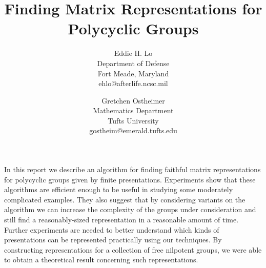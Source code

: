



\newtheorem{theorem}{Theorem}[section]
\newtheorem{proposition}[theorem]{Proposition}
\newtheorem{lemma}[theorem]{Lemma}
\newtheorem{corollary}[theorem]{Corollary}
\newenvironment{hypothesis}{\em Hypothesis $(\dagger):$}{}
\newcommand{\glz}[1]{\mbox{GL} (#1,{\bf Z})}
\newcommand{\trz}[1]{\mbox{Tr}_1(#1,{\bf Z})}

\title{Finding Matrix Representations for Polycyclic Groups}
\author{Eddie H. Lo \\ Department of Defense \\ Fort Meade, Maryland \\
        ehlo@afterlife.ncsc.mil
        \and
        Gretchen Ostheimer \\ Mathematics Department \\ Tufts University \\
        gostheim@emerald.tufts.edu}

\maketitle

In this report we describe an algorithm for finding faithful matrix
representations for polycyclic groups given by finite presentations.
Experiments show that these algorithms are 
efficient enough to be useful in studying some
moderately complicated examples.
They also suggest that by considering variants 
on the algorithm we can increase the complexity
of the groups under consideration and still
find a reasonably-sized 
representation in a reasonable amount of time.
Further experiments are needed to better understand
which kinds of presentations can be represented practically
using our techniques.
By constructing representations for a collection
of free nilpotent groups, 
we were able to obtain a theoretical result 
concerning such representations.

